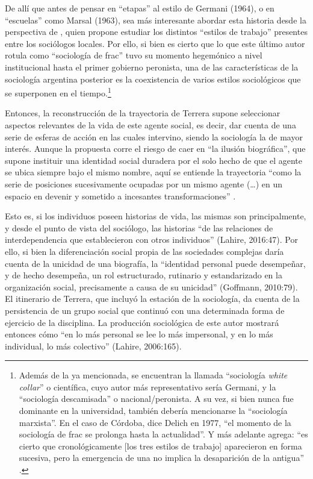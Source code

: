 De allí que antes de pensar en \enquote{etapas} al estilo de Germani (1964), o en \enquote{escuelas} como Marsal (1963), sea más interesante abordar esta historia desde la perspectiva de \textcite{1613-DELICH1977}, quien propone estudiar los distintos \enquote{estilos de trabajo} presentes entre los sociólogos locales. Por ello, si bien es cierto que lo que este último autor rotula como \enquote{sociología de frac} tuvo su momento hegemónico a nivel institucional hasta el primer gobierno peronista, una de las características de la sociología argentina posterior es la coexistencia de varios estilos sociológicos que se superponen en el tiempo.\footnote{Además de la ya mencionada, se encuentran la llamada \enquote{sociología \emph{white collar}} o científica, cuyo autor más representativo sería Germani, y la \enquote{sociología descamisada} o nacional/peronista. A su vez, si bien nunca fue dominante en la universidad, también debería mencionarse la \enquote{sociología marxista}. En el caso de Córdoba, dice Delich en 1977, \enquote{el momento de la sociología de frac se prolonga hasta la actualidad}. Y más adelante agrega: \enquote{es cierto que cronológicamente [los tres estilos de trabajo] aparecieron en forma sucesiva, pero la emergencia de una no implica la desaparición de la antigua} \parencite[28]{1613-DELICH1977}.}

Entonces, la reconstrucción de la trayectoria de Terrera supone seleccionar aspectos relevantes de la vida de este agente social, es decir, dar cuenta de una serie de esferas de acción en las cuales intervino, siendo la sociología la de mayor interés. Aunque la propuesta corre el riesgo de caer en \enquote{la ilusión biográfica}, que supone instituir una identidad social duradera por el solo hecho de que el agente se ubica siempre bajo el mismo nombre, aquí se entiende la trayectoria \enquote{como la serie de posiciones sucesivamente ocupadas por un mismo agente (\dots) en un espacio en devenir y sometido a incesantes transformaciones} \parencite[127]{1578-BOURDIEU2011}.

Esto es, si los individuos poseen historias de vida, las mismas son principalmente, y desde el punto de vista del sociólogo, las historias \enquote{de las relaciones de interdependencia que establecieron con otros individuos} (Lahire, 2016:47). Por ello, si bien la diferenciación social propia de las sociedades complejas daría cuenta de la unicidad de una biografía, la \enquote{identidad personal puede desempeñar, y de hecho desempeña, un rol estructurado, rutinario y estandarizado en la organización social, precisamente a causa de su unicidad} (Goffmann, 2010:79). El itinerario de Terrera, que incluyó la estación de la sociología, da cuenta de la persistencia de un grupo social que continuó con una determinada forma de ejercicio de la disciplina. La producción sociológica de este autor mostrará entonces cómo \enquote{en lo más personal se lee lo más impersonal, y en lo más individual, lo más colectivo} (Lahire, 2006:165).

